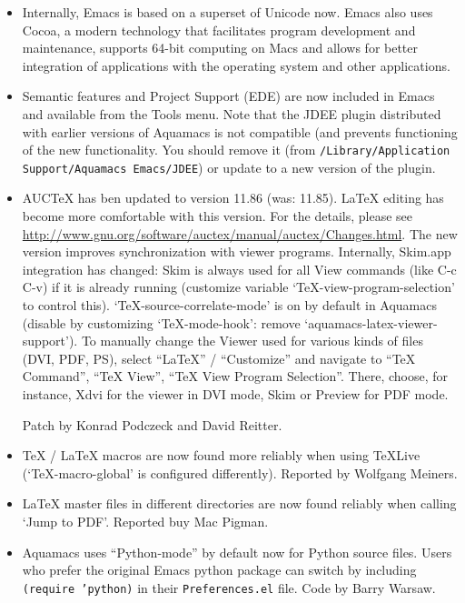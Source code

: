 \begin{itemize}


\item Internally, Emacs is based on a superset of Unicode now.  Emacs also uses Cocoa, a modern technology that facilitates program development and maintenance, supports 64-bit computing on Macs and allows for better integration of applications with the operating system and other applications.  

\item Semantic features and Project Support (EDE) are now included in Emacs and available from the Tools menu.  Note that the JDEE plugin distributed with earlier versions of Aquamacs is not compatible (and prevents functioning of the new functionality.  You should remove it (from {\tt /Library/Application Support/Aquamacs Emacs/JDEE}) or update to a new version of the plugin.

\item AUCTeX has ben updated to version 11.86 (was: 11.85).  LaTeX editing has become more comfortable with this version. For the details, please see {\small \url{http://www.gnu.org/software/auctex/manual/auctex/Changes.html}}.  The new version improves synchronization with viewer programs. Internally, Skim.app integration has changed: Skim is always used for all View commands (like C-c C-v)  if it is already running (customize variable `TeX-view-program-selection' to control this).  `TeX-source-correlate-mode' is on by default in Aquamacs (disable by customizing `TeX-mode-hook': remove `aquamacs-latex-viewer-support').  To manually change the Viewer used for various kinds of files (DVI, PDF, PS), select ``LaTeX'' / ``Customize'' and navigate to ``TeX Command'', ``TeX View'', ``TeX View Program Selection''. There, choose, for instance, Xdvi for the viewer in DVI mode, Skim or Preview for PDF mode. 
 
Patch by Konrad Podczeck and David Reitter.

\item TeX / LaTeX macros are now found more reliably when using TeXLive (`TeX-macro-global' is configured differently).
Reported by Wolfgang Meiners.  %

\item LaTeX master files in different directories are now found reliably when calling `Jump to PDF'.
Reported buy Mac Pigman.  %

\item Aquamacs uses ``Python-mode'' by default now for Python source files.  Users who prefer the original Emacs python package can switch by including {\tt (require 'python)} in their {\tt Preferences.el} file.
Code by Barry Warsaw.


\end{itemize}
